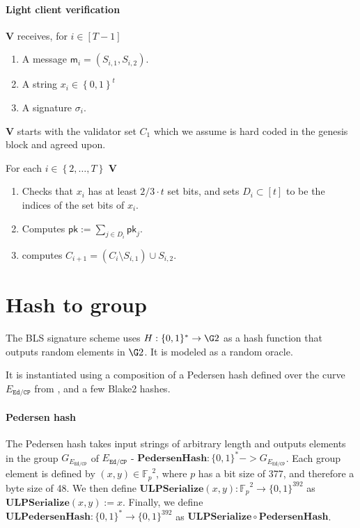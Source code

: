 \documentclass[11pt]{article}
\numberwithin{figure}{section} %
\newcommand{\set}[1]{\ensuremath{\left\{#1\right\}}\xspace}
\newcommand{\Fp}{\ensuremath{\mathbb{F}_p}\xspace}
\newcommand{\defeq}{:=}
\newcommand{\B}{\ensuremath{\set{0,1}}\xspace}
\newcommand{\msg}{\ensuremath{\mathsf{m}}\xspace}
\newcommand{\pk}{\ensuremath{\mathsf{pk}}\xspace}
\newcommand{\phash}{\ensuremath{\mathbf{PedersenHash}}\xspace}
\newcommand{\ulphash}{\ensuremath{\mathbf{ULPedersenHash}}\xspace}
\newcommand{\ulpserialize}{\ensuremath{\mathbf{ULPSerialize}}\xspace}
\newcommand{\ver}{\ensuremath{\mathsf{\mathbf{V}}}\xspace}
\newcommand{\sig}{\ensuremath{\sigma}\xspace}
\newcommand{\edcp}{\ensuremath{{E}_\mathtt{Ed/CP}}\xspace}
\newcommand{\gedcp}{\ensuremath{G_{{E}_\mathtt{Ed/CP}}}\xspace}
\begin{document}
\paragraph{Light client verification}
\ver receives, for $i\in [T-1]$
\begin{enumerate}
 \item A message $\msg_i =(S_{i,1},S_{i,2})$.
 \item A string $x_i\in \B^t$
 \item A signature $\sig_i$.
\end{enumerate}
\ver starts with the validator set $C_1$ which we assume is hard coded in the genesis block and agreed upon.

For each $i\in \set{2,\ldots,T}$ \ver 
\begin{enumerate}
 \item Checks that $x_i$ has at least $2/3\cdot t$ set bits, and sets $D_i\subset [t]$ to be the indices of the set bits of $x_i$.
 \item Computes $\pk\defeq \sum_{j\in D_i} \pk_j$.
 \item computes $C_{i+1} = (C_{i}\setminus S_{i,1})\cup S_{i,2}$.
 
\end{enumerate}

\section{Hash to group}

The BLS signature scheme uses $H: \{0,1\}^* \rightarrow \G2$ as a hash function that outputs random elements in $\G2$. It is modeled as a random oracle.

It is instantiated using a composition of a Pedersen hash defined over the curve $\edcp$ from \cite{bowe2018zexe}, and a few Blake2 hashes. 

\paragraph{Pedersen hash}
The Pedersen hash takes input strings of arbitrary length and outputs elements in the group $\gedcp$ of $\edcp$ - $\phash: \{0,1\}^* -> \gedcp$. Each group element is defined by $(x,y) \in \Fp^2$, where $p$ has a bit size of 377, and therefore a byte size of 48. We then define $\ulpserialize(x,y): \Fp^2 \rightarrow \{0,1\}^{392}$ as $\ulpserialize(x,y) := x$. Finally, we define $\ulphash: \{0,1\}^* \rightarrow \{0,1\}^{392}$ as $\ulpserialize \circ \phash $.
\end{document}
